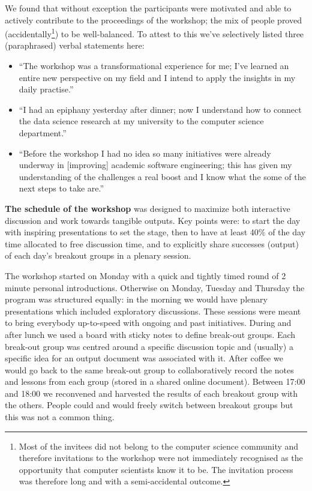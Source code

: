 \documentclass[a4paper,UKenglish]{dagrep}
\begin{document}
We found that without exception the participants were motivated and able to actively contribute to the proceedings of the workshop; the mix of people proved (accidentally\footnote{Most of the invitees did not belong to the computer science community and therefore invitations to the workshop were not immediately recognised as the opportunity that computer scientists know it to be. The invitation process was therefore long and with a semi-accidental outcome.}) to be well-balanced. To attest to this we've selectively listed three (paraphrased) verbal statements here:
\begin{itemize}
\item ``The workshop was a transformational experience for me; I've learned an entire new perspective on my field and I intend to apply the insights in my daily practise.''
\item ``I had an epiphany yesterday after dinner; now I understand how to connect the data science research at my university to the computer science department.''
\item ``Before the workshop I had no idea so many initiatives were already underway in [improving] academic software engineering; this has given my understanding of the challenges a real boost and I know what the some of the next steps to take are.''
\end{itemize}

\textbf{The schedule of the workshop} was designed to maximize both interactive discussion and work towards tangible outputs. Key points were: to start the day with inspiring presentations to set the stage, then to have at least 40\% of the day time allocated to free discussion time, and to explicitly share successes (output) of each day's breakout groups in a plenary session.

The workshop started on Monday with a quick and tightly timed round of 2 minute personal introductions. Otherwise on Monday, Tuesday and Thursday the program was structured equally: in the morning we would have plenary presentations which included exploratory discussions. These sessions were meant to bring everybody up-to-speed with ongoing and past initiatives. During and after lunch we used a board with sticky notes to define break-out groups. Each break-out group was centred around a specific discussion topic and (usually) a specific idea for an output document was associated with it. After coffee we would go back to the same break-out group to collaboratively record the notes and lessons from each group (stored in a shared online document). Between 17:00 and 18:00 we reconvened and harvested the results of each breakout group with the others. People could and would freely switch between breakout groups but this was not a common thing.
\end{document}
